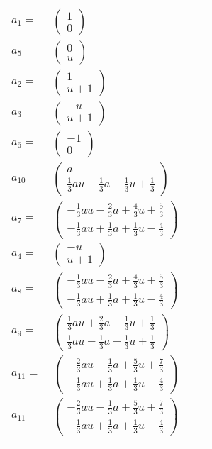\documentclass[1p]{elsarticle_modified}
\theoremstyle{definition}
\begin{document}
\begin{tabular}{m{7pt} m{180pt} m{7pt} m{180pt} }
\flushright $a_{1}=$&$\begin{pmatrix}1\\0\end{pmatrix}$ \\
\flushright $a_{5}=$&$\begin{pmatrix}0\\u\end{pmatrix}$ \\
\flushright $a_{2}=$&$\begin{pmatrix}1\\u+1\end{pmatrix}$ \\
\flushright $a_{3}=$&$\begin{pmatrix}- u\\u+1\end{pmatrix}$ \\
\flushright $a_{6}=$&$\begin{pmatrix}-1\\0\end{pmatrix}$ \\
\flushright $a_{10}=$&$\begin{pmatrix}a\\\frac{1}{3} a u-\frac{1}{3} a-\frac{1}{3} u+\frac{1}{3}\end{pmatrix}$ \\
\flushright $a_{7}=$&$\begin{pmatrix}-\frac{1}{3} a u-\frac{2}{3} a+\frac{4}{3} u+\frac{5}{3}\\-\frac{1}{3} a u+\frac{1}{3} a+\frac{1}{3} u-\frac{4}{3}\end{pmatrix}$ \\
\flushright $a_{4}=$&$\begin{pmatrix}- u\\u+1\end{pmatrix}$ \\
\flushright $a_{8}=$&$\begin{pmatrix}-\frac{1}{3} a u-\frac{2}{3} a+\frac{4}{3} u+\frac{5}{3}\\-\frac{1}{3} a u+\frac{1}{3} a+\frac{1}{3} u-\frac{4}{3}\end{pmatrix}$ \\
\flushright $a_{9}=$&$\begin{pmatrix}\frac{1}{3} a u+\frac{2}{3} a-\frac{1}{3} u+\frac{1}{3}\\\frac{1}{3} a u-\frac{1}{3} a-\frac{1}{3} u+\frac{1}{3}\end{pmatrix}$ \\
\flushright $a_{11}=$&$\begin{pmatrix}-\frac{2}{3} a u-\frac{1}{3} a+\frac{5}{3} u+\frac{7}{3}\\-\frac{1}{3} a u+\frac{1}{3} a+\frac{1}{3} u-\frac{4}{3}\end{pmatrix}$\\ \flushright $a_{11}=$&$\begin{pmatrix}-\frac{2}{3} a u-\frac{1}{3} a+\frac{5}{3} u+\frac{7}{3}\\-\frac{1}{3} a u+\frac{1}{3} a+\frac{1}{3} u-\frac{4}{3}\end{pmatrix}$\\&\end{tabular}
\end{document}
